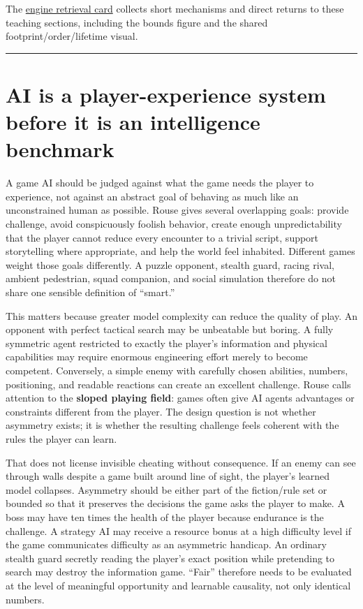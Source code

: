 The \hyperref[appendix-64ea716dcadc]{engine retrieval card} collects short mechanisms and direct returns to these teaching sections, including the bounds figure and the shared footprint/order/lifetime visual.

\begin{center}\rule{0.5\linewidth}{0.5pt}\end{center}

\section{AI is a player-experience system before it is an intelligence benchmark}\label{06-engine-ii-ch047-ai-is-a-player-experience-system-before-it-is-an-intelligence-benchmark}

\hypertarget{06-engine-ii-ch047-ai-is-a-player-experience-system-before-it-is-an-intelligence-benchmark}{}

A game AI should be judged against what the game needs the player to experience, not against an abstract goal of behaving as much like an unconstrained human as possible. Rouse gives several overlapping goals: provide challenge, avoid conspicuously foolish behavior, create enough unpredictability that the player cannot reduce every encounter to a trivial script, support storytelling where appropriate, and help the world feel inhabited. Different games weight those goals differently. A puzzle opponent, stealth guard, racing rival, ambient pedestrian, squad companion, and social simulation therefore do not share one sensible definition of ``smart.''

This matters because greater model complexity can reduce the quality of play. An opponent with perfect tactical search may be unbeatable but boring. A fully symmetric agent restricted to exactly the player's information and physical capabilities may require enormous engineering effort merely to become competent. Conversely, a simple enemy with carefully chosen abilities, numbers, positioning, and readable reactions can create an excellent challenge. Rouse calls attention to the \textbf{sloped playing field}: games often give AI agents advantages or constraints different from the player. The design question is not whether asymmetry exists; it is whether the resulting challenge feels coherent with the rules the player can learn.

That does not license invisible cheating without consequence. If an enemy can see through walls despite a game built around line of sight, the player's learned model collapses. Asymmetry should be either part of the fiction/rule set or bounded so that it preserves the decisions the game asks the player to make. A boss may have ten times the health of the player because endurance is the challenge. A strategy AI may receive a resource bonus at a high difficulty level if the game communicates difficulty as an asymmetric handicap. An ordinary stealth guard secretly reading the player's exact position while pretending to search may destroy the information game. ``Fair'' therefore needs to be evaluated at the level of meaningful opportunity and learnable causality, not only identical numbers.

